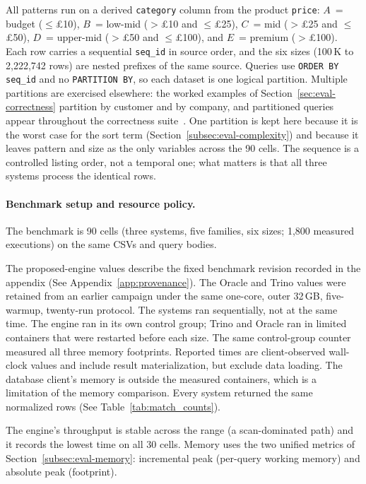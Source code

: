 \noindent
All patterns run on a derived \texttt{category} column from the product
\texttt{price}: $A$~= budget ($\le$\pounds10), $B$~= low-mid
($>$\pounds10 and $\le$\pounds25), $C$~= mid ($>$\pounds25 and
$\le$\pounds50), $D$~= upper-mid ($>$\pounds50 and
$\le$\pounds100), and $E$~= premium ($>$\pounds100).  Each row carries
a sequential \texttt{seq\_id} in source order, and the six sizes
(100\,K to 2{,}222{,}742 rows) are nested prefixes of the same source.
Queries use
\texttt{ORDER~BY seq\_id} and no \texttt{PARTITION~BY}, so each dataset
is one logical partition.  Multiple partitions are exercised elsewhere:
the worked examples of Section~\ref{sec:eval-correctness} partition by
customer and by company, and partitioned queries appear throughout the
correctness suite~\cite{monierashraf2025tests}.  One partition is kept
here because it is the worst case for the sort term
(Section~\ref{subsec:eval-complexity}) and because it leaves pattern
and size as the only variables across the 90 cells.
The sequence is a controlled listing order,
not a temporal one; what matters is that all three systems process the
identical rows.

\paragraph{Benchmark setup and resource policy.}
The benchmark is 90 cells (three systems, five families, six sizes;
1{,}800 measured executions) on the same CSVs and query bodies.

The proposed-engine values describe the fixed benchmark revision recorded
in the appendix (See Appendix~\ref{app:provenance}).  The Oracle and Trino
values
were retained from an earlier campaign under the same one-core, outer
32\,GB, five-warmup, twenty-run protocol.  The systems ran sequentially, not
at the same time.  The engine ran in its own control group; Trino and
Oracle ran in limited containers that were restarted before each size.
The same control-group counter measured all three memory footprints.
Reported times are client-observed wall-clock values and include result
materialization, but exclude data loading.  The database client's
memory is outside the measured containers, which is a limitation of
the memory comparison.  Every system returned the same normalized
rows (See Table~\ref{tab:match_counts}).

The engine's throughput is stable across the range (a scan-dominated
path) and it records the lowest time on all 30 cells.  Memory uses the
two unified metrics of Section~\ref{subsec:eval-memory}: incremental
peak (per-query working memory) and absolute peak (footprint).


